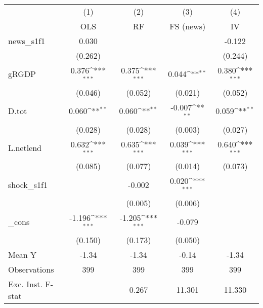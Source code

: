 {
\def\sym#1{\ifmmode^{#1}\else\(^{#1}\)\fi}
\begin{tabular}{l*{4}{c}}
\toprule
            &\multicolumn{1}{c}{(1)}&\multicolumn{1}{c}{(2)}&\multicolumn{1}{c}{(3)}&\multicolumn{1}{c}{(4)}\\
            &\multicolumn{1}{c}{OLS}&\multicolumn{1}{c}{RF}&\multicolumn{1}{c}{FS (news)}&\multicolumn{1}{c}{IV}\\
\midrule
news\_s1f1   &       0.030         &                     &                     &      -0.122         \\
            &     (0.262)         &                     &                     &     (0.244)         \\
\addlinespace
gRGDP       &       0.376\sym{***}&       0.375\sym{***}&       0.044\sym{**} &       0.380\sym{***}\\
            &     (0.046)         &     (0.052)         &     (0.021)         &     (0.052)         \\
\addlinespace
D.tot       &       0.060\sym{**} &       0.060\sym{**} &      -0.007\sym{**} &       0.059\sym{**} \\
            &     (0.028)         &     (0.028)         &     (0.003)         &     (0.027)         \\
\addlinespace
L.netlend   &       0.632\sym{***}&       0.635\sym{***}&       0.039\sym{***}&       0.640\sym{***}\\
            &     (0.085)         &     (0.077)         &     (0.014)         &     (0.073)         \\
\addlinespace
shock\_s1f1  &                     &      -0.002         &       0.020\sym{***}&                     \\
            &                     &     (0.005)         &     (0.006)         &                     \\
\addlinespace
\_cons      &      -1.196\sym{***}&      -1.205\sym{***}&      -0.079         &                     \\
            &     (0.150)         &     (0.173)         &     (0.050)         &                     \\
\midrule
Mean Y      &       -1.34         &       -1.34         &       -0.14         &       -1.34         \\
Observations&         399         &         399         &         399         &         399         \\
Exc. Inst. F-stat&                     &       0.267         &      11.301         &      11.330         \\
\bottomrule
\end{tabular}
}
